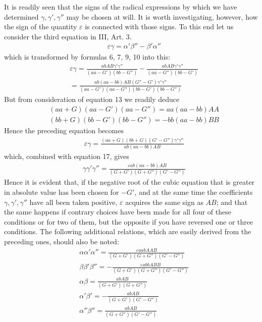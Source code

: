 It is readily seen that the signs of the radical expressions by which we have determined $\gamma,\gamma',\gamma''$ may be chosen at will. It is worth investigating, however, how the sign of the quantity $\varepsilon$ is connected with those signs. To this end let us consider the third equation in III, Art. 3.
\[
\begin{aligned}
&\varepsilon\gamma=\alpha'\beta''-\beta'\alpha''
\end{aligned}
\]
which is transformed by formulas 6, 7, 9, 10 into this:
\[
\begin{aligned}
&\varepsilon\gamma=\frac{abAB\gamma'\gamma''}{(aa-G')(bb-G'')}-\frac{abAB\gamma'\gamma''}{(aa-G'')(bb-G')}\\[8pt]
&=\frac{ab(aa-bb)AB(G''-G')\gamma'\gamma''}{(aa-G')(aa-G'')(bb-G')(bb-G'')}
\end{aligned}
\]
But from consideration of equation 13 we readily deduce
\[
\begin{aligned}
&(aa+G)(aa-G')(aa-G'')=aa(aa-bb)AA\\[8pt]
&(bb+G)(bb-G')(bb-G'')=-bb(aa-bb)BB
\end{aligned}
\]
Hence the preceding equation becomes
\[
\begin{aligned}
&\varepsilon\gamma=\frac{(aa+G)(bb+G)(G'-G'')\gamma'\gamma''}{ab(aa-bb)AB}
\end{aligned}
\]
which, combined with equation 17, gives
\[
\begin{aligned}
&\gamma\gamma'\gamma''=\frac{\varepsilon ab(aa-bb)AB}{(G+G')(G+G'')(G'-G'')}
\end{aligned}
\]
Hence it is evident that, if the negative root of the cubic equation that is greater in absolute value has been chosen for $-G'$, and at the same time the coefficients $\gamma,\gamma',\gamma''$ have all been taken positive, $\varepsilon$ acquires the same sign as $AB$; and that the same happens if contrary choices have been made for all four of these conditions or for two of them, but the opposite if you have reversed one or three conditions. The following additional relations, which are easily derived from the preceding ones, should also be noted:
\[
\begin{aligned}
&\alpha\alpha'\alpha''=\frac{\varepsilon aabAAB}{(G+G')(G+G'')(G'-G'')}\\[8pt]
&\beta\beta'\beta''=-\frac{\varepsilon abbABB}{(G+G')(G+G'')(G'-G'')}\\[8pt]
&\alpha\beta=\frac{abAB}{(G+G')(G+G'')}\\[8pt]
&\alpha'\beta'=-\frac{abAB}{(G+G')(G'-G'')}\\[8pt]
&\alpha''\beta''=\frac{abAB}{(G+G'')(G'-G'')}
\end{aligned}
\]

\clearpage
\endgroup
